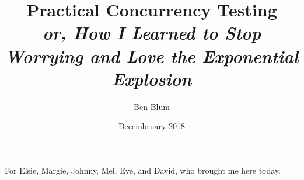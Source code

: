 \documentclass[12pt]{cmuthesis}
\begin{document}
\frontmatter

\pagestyle{empty}

\title{ %
{\bf Practical Concurrency Testing} \\
\normalsize \vspace{1em}
{\em or, How I Learned to Stop Worrying and Love the Exponential Explosion}}
\author{Ben Blum}
\date{Decembruary 2018}
\trnumber{}


\support{}
\disclaimer{}



\maketitle

\begin{dedication}
For Elsie, Margie, Johnny, Mel, Eve, and David, who brought me here today.
\end{dedication}

\pagestyle{plain} %

\end{document}
